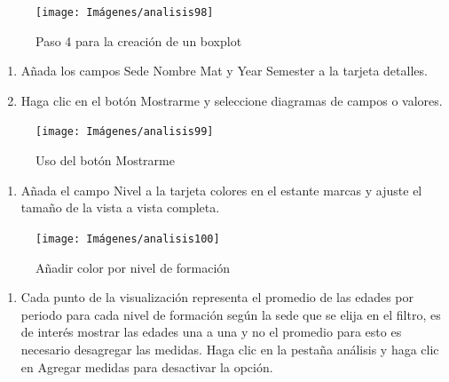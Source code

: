 \documentclass[
]{book}
\providecommand{\tightlist}{%
  \setlength{\itemsep}{0pt}\setlength{\parskip}{0pt}}
\begin{document}
\begin{figure}

{\centering \texttt{[image: Imágenes/analisis98]} 

}

\caption{Paso 4 para la creación de un boxplot}\label{fig:paso4boxplot-fig}
\end{figure}

\begin{enumerate}
\def\labelenumi{\arabic{enumi}.}
\setcounter{enumi}{4}
\item
  Añada los campos Sede Nombre Mat y Year Semester a la tarjeta detalles.
\item
  Haga clic en el botón Mostrarme y seleccione diagramas de campos o valores.
\end{enumerate}

\begin{figure}

{\centering \texttt{[image: Imágenes/analisis99]} 

}

\caption{Uso del botón Mostrarme}\label{fig:paso6boxplot-fig}
\end{figure}

\begin{enumerate}
\def\labelenumi{\arabic{enumi}.}
\setcounter{enumi}{6}
\tightlist
\item
  Añada el campo Nivel a la tarjeta colores en el estante marcas y ajuste el tamaño de la vista a vista completa.
\end{enumerate}

\begin{figure}

{\centering \texttt{[image: Imágenes/analisis100]} 

}

\caption{Añadir color por nivel de formación}\label{fig:paso7boxplot-fig}
\end{figure}

\begin{enumerate}
\def\labelenumi{\arabic{enumi}.}
\setcounter{enumi}{7}
\tightlist
\item
  Cada punto de la visualización representa el promedio de las edades por periodo para cada nivel de formación según la sede que se elija en el filtro, es de interés mostrar las edades una a una y no el promedio para esto es necesario desagregar las medidas. Haga clic en la pestaña análisis y haga clic en Agregar medidas para desactivar la opción.
\end{enumerate}
\end{document}
